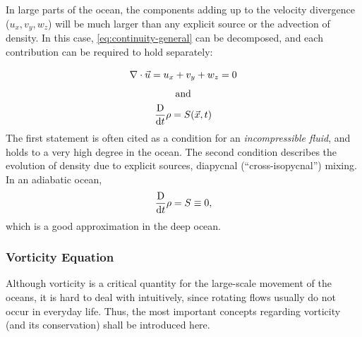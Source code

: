 In large parts of the ocean, the components adding up to the velocity divergence (\ie \(u_x, v_y, w_z\)) will be much larger than any explicit source or the advection of density. In this case, \eqref{eq:continuity-general} can be decomposed, and each contribution can be required to hold separately:
%
\begin{gather}
\nabla \cdot \vec{u} = u_x + v_y + w_z = 0 \vphantom{\Ddx} \label{eq:incompressible} \\
\text{and} \\
\Ddx \rho = S(\vec{x},t) \label{eq:continuity-diabatic}
\end{gather}
%
The first statement is often cited as a condition for an \emph{incompressible fluid}, and holds to a very high degree in the ocean. The second condition describes the evolution of density due to explicit sources, \ie diapycnal (\enquote{cross-isopycnal}) mixing. In an adiabatic ocean,%
\begin{equation} 
	\frac{\text{D}}{\text{d}t} \rho = S \equiv 0, \label{eq:adiabatic}
\end{equation}
%
which is a good approximation in the deep ocean.

\subsubsection{Vorticity Equation}
\label{sec:general-vorticity}
Although vorticity is a critical quantity for the large-scale movement of the oceans, it is hard to deal with intuitively, since rotating flows usually do not occur in everyday life. Thus, the most important concepts regarding vorticity (and its conservation) shall be introduced here.

